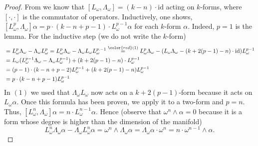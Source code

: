 \begin{proof}
    From \parencite[Lemma 9.39]{lee_introCM} we know that \([L_\omega, \Lambda_\omega]=(k-n)\cdot \mathrm{id}\) acting on \(k\)-forms, where \([\cdot, \cdot]\) is the commutator of operators. Inductively, one shows, \([L_\omega^p, \Lambda_\omega]\alpha=p\cdot(k-n+p-1) \cdot L_\omega ^{p-1}\alpha\) for each \(k\)-form \(\alpha\). Indeed, \(p=1\) is the lemma. For the inductive step (we do not write the \(k\)-form)
    \begin{align*}
        [L_\omega^p, \Lambda_\omega] & = L_\omega^p\Lambda_\omega-\Lambda_\omega L_\omega^p =  L_\omega^p \Lambda_\omega-\Lambda_\omega L_\omega L_\omega^{p.-1} \overset{{\color{red}(1)}}{=} L_\omega^p \Lambda_\omega-(L_\omega \Lambda_\omega-(k+2(p-1)-n)\cdot \mathrm{id})L_\omega^{p-1} \\
        & = L_\omega (L_\omega^{p-1}\Lambda_\omega-\Lambda_\omega L_\omega^{p-1})+(k+2(p-1)-n) \cdot L_\omega^{p-1} \\
        & = (p-1)\cdot (k-n+p-2) L_\omega^{p-1} + (k+2(p-1)-n) L_\omega^{p-1} \\
        & = p\cdot (k-n+p-1) L_\omega^{p-1}
    \end{align*}
    In {\color{red}\((1)\)} we used that \(\Lambda_\omega L_\omega\) now acts on a \(k+2(p-1)\)-form because it acts on \(L_\omega \alpha\). Once this formula has been proven, we apply it to a two-form and \(p=n\). Thus, \([L_\omega^n, \Lambda_\omega]\alpha=n\cdot L_\omega^{n-1}\alpha\). Hence (observe that \(\omega^n\wedge \alpha=0\) because it is a form whose degree is higher than the dimension of the manifold)
    \[
    L_\omega^n \Lambda_\omega\alpha -\Lambda_\omega L_\omega^n \alpha= \omega^n \wedge \Lambda_\omega \alpha = \Lambda_\omega \alpha \cdot \omega^n = n \cdot \omega^{n-1} \wedge  \alpha.
    \]
\end{proof}